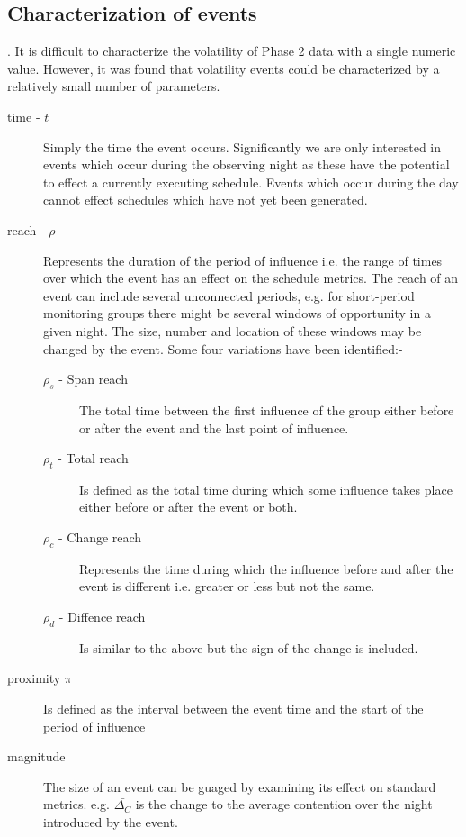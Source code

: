 \subsection{Characterization of events}.
\label{sect:volchar} 
It is difficult to characterize the volatility of Phase 2 data with a single numeric value. However, it was found that volatility events could be characterized by a relatively small number of parameters.
\begin{description} 
\item [time - $t$] Simply the time the event occurs. Significantly we are only interested in events which occur during the observing night as these have the potential to effect a currently executing schedule. Events which occur during the day cannot effect schedules which have not yet been generated.
\item [reach - $\rho$] Represents the duration of the period of influence i.e. the range of times over which the event has an effect on the schedule metrics. The reach of an event can include several unconnected periods, e.g.  for short-period monitoring groups there might be several windows of opportunity in a given night. The size, number and location of these windows may be changed by the event. Some four variations have been identified:-
\begin{description}

\item [$\rho_s$ - Span reach] The total time between the first influence of the group either before or after the event and the last point of influence.
\item [$\rho_t$ - Total reach] Is defined as the total time during which some influence takes place either before or after the event or both.
\item [$\rho_c$ - Change reach] Represents the time during which the influence before and after the event is different i.e. greater or less but not the same. 
\item [$\rho_d$ - Diffence reach] Is similar to the above but the sign of the change is included.
\end{description}
\item [proximity $\pi$] Is defined as the interval between the event time and the start of the period of influence
\item [magnitude] The size of an event can be guaged by examining its effect on standard metrics. e.g. $\bar{\Delta_C}$ is the change to the average contention over the night introduced by the event.
\end{description}



